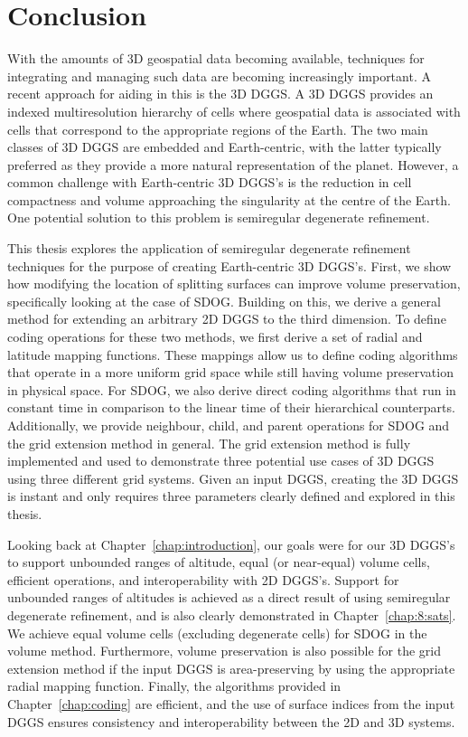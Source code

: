 \chapter{Conclusion} \label{chap:conclusion}
With the amounts of 3D geospatial data becoming available, techniques for integrating and managing such data are becoming increasingly important.
A recent approach for aiding in this is the 3D DGGS.
A 3D DGGS provides an indexed multiresolution hierarchy of cells where geospatial data is associated with cells that correspond to the appropriate regions of the Earth.
The two main classes of 3D DGGS are embedded and Earth-centric, with the latter typically preferred as they provide a more natural representation of the planet.
However, a common challenge with Earth-centric 3D DGGS's is the reduction in cell compactness and volume approaching the singularity at the centre of the Earth.
One potential solution to this problem is semiregular degenerate refinement.


This thesis explores the application of semiregular degenerate refinement techniques for the purpose of creating Earth-centric 3D DGGS's.
First, we show how modifying the location of splitting surfaces can improve volume preservation, specifically looking at the case of SDOG.
Building on this, we derive a general method for extending an arbitrary 2D DGGS to the third dimension.
To define coding operations for these two methods, we first derive a set of radial and latitude mapping functions.
These mappings allow us to define coding algorithms that operate in a more uniform grid space while still having volume preservation in physical space.
For SDOG, we also derive direct coding algorithms that run in constant time in comparison to the linear time of their hierarchical counterparts.
Additionally, we provide neighbour, child, and parent operations for SDOG and the grid extension method in general.
The grid extension method is fully implemented and used to demonstrate three potential use cases of 3D DGGS using three different grid systems.
Given an input DGGS, creating the 3D DGGS is instant and only requires three parameters clearly defined and explored in this thesis.


Looking back at Chapter~\ref{chap:introduction}, our goals were for our 3D DGGS's to support unbounded ranges of altitude, equal (or near-equal) volume cells, efficient operations, and interoperability with 2D DGGS's.
Support for unbounded ranges of altitudes is achieved as a direct result of using semiregular degenerate refinement, and is also clearly demonstrated in Chapter~\ref{chap:8:sats}.
We achieve equal volume cells (excluding degenerate cells) for SDOG in the volume method.
Furthermore, volume preservation is also possible for the grid extension method if the input DGGS is area-preserving by using the appropriate radial mapping function.
Finally, the algorithms provided in Chapter~\ref{chap:coding} are efficient, and the use of surface indices from the input DGGS ensures consistency and interoperability between the 2D and 3D systems.


